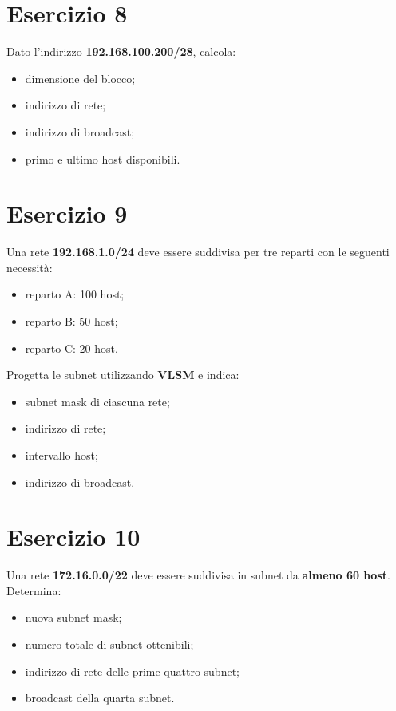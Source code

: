 \documentclass[a4paper,12pt]{article}
\begin{document}
\section*{Esercizio 8}
Dato l'indirizzo \textbf{192.168.100.200/28}, calcola:
\begin{itemize}
    \item dimensione del blocco;
    \item indirizzo di rete;
    \item indirizzo di broadcast;
    \item primo e ultimo host disponibili.
\end{itemize}

\section*{Esercizio 9}
Una rete \textbf{192.168.1.0/24} deve essere suddivisa per tre reparti con le seguenti necessità:
\begin{itemize}
    \item reparto A: 100 host;
    \item reparto B: 50 host;
    \item reparto C: 20 host.
\end{itemize}
Progetta le subnet utilizzando \textbf{VLSM} e indica:
\begin{itemize}
    \item subnet mask di ciascuna rete;
    \item indirizzo di rete;
    \item intervallo host;
    \item indirizzo di broadcast.
\end{itemize}

\section*{Esercizio 10}
Una rete \textbf{172.16.0.0/22} deve essere suddivisa in subnet da \textbf{almeno 60 host}. Determina:
\begin{itemize}
    \item nuova subnet mask;
    \item numero totale di subnet ottenibili;
    \item indirizzo di rete delle prime quattro subnet;
    \item broadcast della quarta subnet.
\end{itemize}
\end{document}

